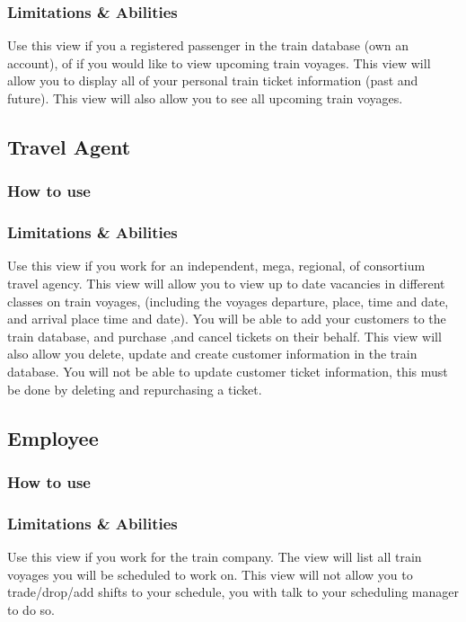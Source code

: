 \documentclass[letter]{article}
\begin{document}
\subsubsection{Limitations \& Abilities}
Use this view if you a registered passenger in the train database (own an account), of if you would like to view upcoming train voyages. This view will allow you to display all of your personal train ticket information (past and future).  This view will also allow you to see all upcoming train voyages.

\subsection{Travel Agent}
\subsubsection{How to use}

\subsubsection{Limitations \& Abilities}
Use this view if you work for an independent, mega, regional, of consortium travel agency. This view will allow you to view up to date vacancies in different classes on train voyages, (including the voyages departure, place, time and date, and arrival place time and date).  You will be able to add your customers to the train database, and purchase ,and cancel tickets on their behalf. This view will also allow you delete, update and create customer information in the train database. You will not be able to update customer ticket information, this must be done by deleting and repurchasing a ticket. 


\subsection{Employee}
\subsubsection{How to use}

\subsubsection{Limitations \& Abilities}
Use this view if you work for the train company. The view will list all train voyages you will be scheduled to work on.  This view will not allow you to trade/drop/add shifts to your schedule, you with talk to your scheduling manager  to do so.
\end{document}

